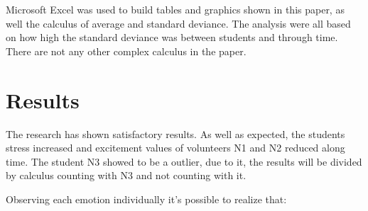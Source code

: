 \documentclass[12pt,openright,a4paper]{article}
\begin{document}
 Microsoft Excel was used to build tables and graphics shown in this paper, as well the calculus of average and standard deviance. The analysis were all based on how high the standard deviance was between students and through time. There are not any other complex calculus in the paper.  
 \newpage
\section{Results}
 The research has shown satisfactory results. As well as expected, the students stress increased and excitement values of volunteers N1 and N2  reduced along time. The student N3 showed to be a outlier, due to it, the results will be divided by calculus counting with N3 and not counting with it.
 
 Observing each emotion individually it’s possible to realize that:
\end{document}
